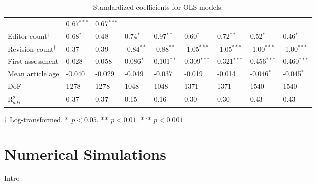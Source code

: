 \documentclass[10pt,twocolumn]{article}
\newcommand{\+}{\phantom{-}}
\begin{document}
\begin{table*}
\begin{tabular}{lllllllll}
                               & \+0.67$^{***}$  & \+0.67$^{***}$ \\
Editor count$^\dagger$         & \+0.68$^{*}$    & \+0.48         
                               & \+0.74$^{*}$    & \+0.97$^{**}$
                               & \+0.60$^{*}$    & \+0.72$^{**}$
                               & \+0.52$^{*}$    & \+0.46$^{*}$ \\
Revision count$^\dagger$       & \+0.37          & \+0.39         
                               &  -0.84$^{**}$   & -0.88$^{**}$
                               &  -1.05$^{***}$  & -1.05$^{***}$
                               &  -1.00$^{***}$  & -1.00$^{***}$ \\
First assessment               & \+0.028         & \+0.058        
                               & \+0.086$^{*}$   & \+0.101$^{**}$
                               & \+0.309$^{***}$ & \+0.321$^{***}$
                               & \+0.456$^{***}$ & \+0.460$^{***}$ \\
Mean article age               &  -0.040         & -0.029         
                               &  -0.049         & -0.037
                               &  -0.019         & -0.014
                               &  -0.046$^{*}$   & -0.045$^{*}$ \\
\hline
DoF                            & 1278            & 1278          
                               & 1048            & 1048
                               & 1371            & 1371
                               & 1540            & 1540 \\
R$^2_{adj}$                    & 0.37            & 0.37          
                               & 0.15            & 0.16
                               & 0.30            & 0.30
                               & 0.43            & 0.43 \\
\end{tabular}
\caption{Standardized coefficients for OLS models.
\label{tab:model}
}
\begin{tablenotes}
\item $\dagger$ Log-transformed. * $p < 0.05$. ** $p < 0.01$. *** $p < 0.001$.
\end{tablenotes}
\end{table*}

\section{Numerical Simulations}

Intro
\end{document}
